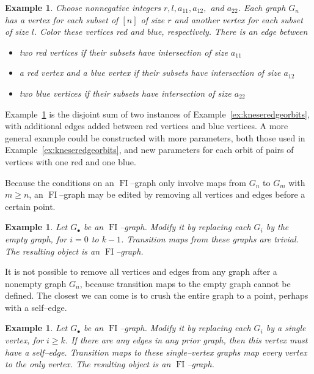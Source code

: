 \documentclass[10pt]{amsart}
\DeclareMathOperator{\FI}{FI}
\newcommand{\dt}{\bullet}
\newtheorem{example}[theorem]{Example}
\theoremstyle{definition}
\begin{document}
\begin{example}\label{ex:twoknesers}
Choose nonnegative integers $r, l, a_{11}, a_{12},$ and $a_{22}$. Each graph $G_n$ has a vertex for each subset of $[n]$ of size $r$ and another vertex for each subset of size $l$. Color these vertices red and blue, respectively. There is an edge between
\begin{itemize}
\item two red vertices if their subsets have intersection of size $a_{11}$
\item a red vertex and a blue vertex if their subsets have intersection of size $a_{12}$
\item two blue vertices if their subsets have intersection of size $a_{22}$
\end{itemize} 
\end{example}

Example~\ref{ex:twoknesers} is the disjoint sum of two instances of Example~\ref{ex:kneseredgeorbits}, with additional edges added between red vertices and blue vertices. A more general example could be constructed with more parameters, both those used in Example~\ref{ex:kneseredgeorbits}, and new parameters for each orbit of pairs of vertices with one red and one blue.

Because the conditions on an $\FI$--graph only involve maps from $G_n$ to $G_m$ with $m \geq n$, an $\FI$--graph may be edited by removing all vertices and edges before a certain point. 

\begin{example}\label{ex:zeromod}
Let $G_\dt$ be an $\FI$--graph. Modify it by replacing each $G_i$ by the empty graph, for $i = 0$ to $k-1$. Transition maps from these graphs are trivial. The resulting object is an $\FI$--graph.
\end{example}

It is not possible to remove all vertices and edges from any graph after a nonempty graph $G_n$, because transition maps to the empty graph cannot be defined. The closest we can come is to crush the entire graph to a point, perhaps with a self--edge. 

\begin{example}\label{ex:onemod}
Let $G_\dt$ be an $\FI$--graph. Modify it by replacing each $G_i$ by a single vertex, for $i \geq k$. If there are any edges in any prior graph, then this vertex must have a self--edge. Transition maps to these single--vertex graphs map every vertex to the only vertex. The resulting object is an $\FI$--graph.
\end{example}
\end{document}
